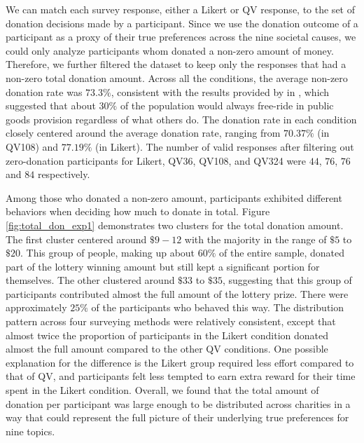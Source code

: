 We can match each survey response, 
either a Likert or QV response,
to the set of donation decisions
made by a participant.
Since we use the donation outcome of a participant 
as a proxy of their true preferences 
across the nine societal causes, 
we could only analyze
participants whom donated a non-zero amount of money.
Therefore, we further filtered the dataset 
to keep only the responses 
that had a non-zero total donation amount.
Across all the conditions, 
the average non-zero donation rate was $73.3\%$,
consistent with the results provided by \textcite{fehr2007human} in \citeyear{fehr2007human},
which suggested that about $30\%$ of the population 
would always free-ride in public goods provision 
regardless of what others do. 
The donation rate in each condition 
closely centered around the average donation rate, 
ranging from $70.37\%$ (in QV108) and $77.19\%$ (in Likert).
The number of valid responses after filtering out zero-donation participants for
Likert, QV36, QV108, and QV324 were $44$, $76$, $76$ and $84$ respectively.

Among those who donated a non-zero amount,
participants exhibited different behaviors
when deciding how much to donate in total. 
Figure \ref{fig:total_don_exp1} demonstrates
two clusters for the total donation amount. 
The first cluster centered around $\$9-12$
with the majority in the range of $\$5$ to $\$20$. 
This group of people,
making up about $60\%$ of the entire sample, 
donated part of the lottery winning amount
but still kept a significant portion for themselves.
The other clustered around $\$33$ to $\$35$, 
suggesting that this group of participants
contributed almost the full amount of the lottery prize. 
There were approximately $25\%$ of the participants who behaved this way. 
The distribution pattern across 
four surveying methods were relatively consistent, 
except that almost twice the proportion of participants 
in the Likert condition donated almost the full amount 
compared to the other QV conditions.
One possible explanation for the difference is 
the Likert group required less effort compared to that of QV, 
and participants felt less tempted 
to earn extra reward for their time spent in the Likert condition. 
Overall, we found that the total amount of donation per participant 
was large enough to be distributed across charities
in a way that could represent the full picture of 
their underlying true preferences for nine topics.

